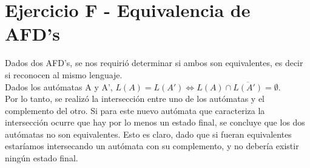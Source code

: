 \section{Ejercicio F - Equivalencia de AFD's}
\indent \indent Dados dos AFD's, se nos requirió determinar si ambos son equivalentes, es decir si reconocen al mismo lenguaje.\\
\indent Dados los autómatas A y A', $L(A) = L(A') \Leftrightarrow L(A) \cap \overline{L(A')} = \emptyset$.\\
Por lo tanto, se realizó la intersección entre uno de los autómatas y el complemento del otro. Si para este nuevo autómata que caracteriza la intersección ocurre que hay por lo menos un estado final, se concluye que los dos autómatas no son equivalentes. Esto es claro, dado que si fueran equivalentes estaríamos intersecando un autómata con su complemento, y no debería existir ningún estado final.\\

